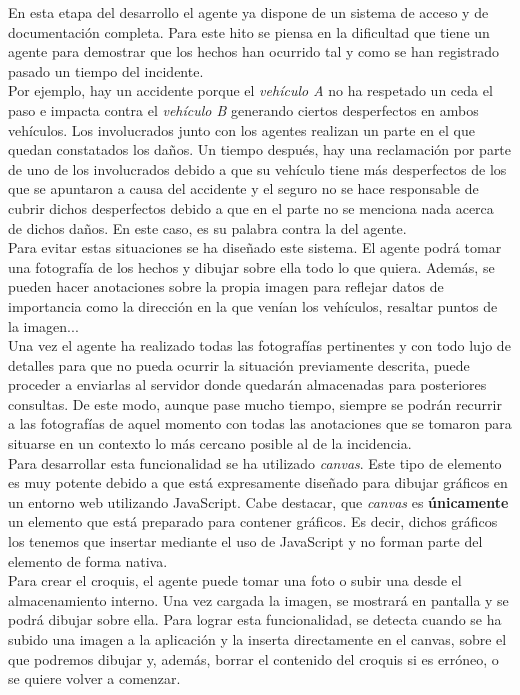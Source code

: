 En esta etapa del desarrollo el agente ya dispone de un sistema de acceso y de documentación completa. Para este hito se piensa en la dificultad que tiene un agente para 
demostrar que los hechos han ocurrido tal y como se han registrado pasado un tiempo del incidente.\\

Por ejemplo, hay un accidente porque el \textit{vehículo A} no ha respetado un ceda el paso e impacta contra el \textit{vehículo B} generando ciertos desperfectos en ambos
vehículos. Los involucrados junto con los agentes realizan un parte en el que quedan constatados los daños.  Un tiempo después, hay una reclamación por parte de uno de los
involucrados debido a que su vehículo tiene más desperfectos de los que se apuntaron a causa del accidente y el seguro no se hace responsable de cubrir dichos desperfectos
debido a que en el parte no se menciona nada acerca de dichos daños. En este caso, es su palabra contra la del agente.\\

Para evitar estas situaciones se ha diseñado este sistema. El agente podrá tomar una fotografía de los hechos y dibujar sobre ella todo lo que quiera. Además, se 
pueden hacer anotaciones sobre la propia imagen para reflejar datos de importancia como la dirección en la que venían los vehículos, resaltar puntos de la imagen...\\

Una vez el agente ha realizado todas las fotografías pertinentes y con todo lujo de detalles para que no pueda ocurrir la situación previamente descrita,
puede proceder a enviarlas al servidor donde quedarán almacenadas para posteriores consultas. De este modo, aunque pase mucho tiempo, siempre se podrán recurrir a 
las fotografías de aquel momento con todas las anotaciones que se tomaron para situarse en un contexto lo más cercano posible al de la incidencia. \\

Para desarrollar esta funcionalidad se ha utilizado \textit{canvas}\cite{canvas}. Este tipo de elemento es muy potente debido a que está expresamente diseñado para 
dibujar gráficos en un entorno web utilizando JavaScript. Cabe destacar, que \textit{canvas} es \textbf{únicamente} un elemento que está preparado para contener gráficos.
Es decir, dichos gráficos los tenemos que insertar mediante el uso de JavaScript y no forman parte del elemento de forma nativa.\\

Para crear el croquis, el agente puede tomar una foto o subir una desde el almacenamiento interno. Una vez cargada la imagen, se mostrará en pantalla y se podrá 
dibujar sobre ella. Para lograr esta funcionalidad, se detecta cuando se ha subido una imagen a la aplicación y la inserta directamente en el canvas, sobre el que 
podremos dibujar y, además, borrar el contenido del croquis si es erróneo, o se quiere volver a comenzar.


